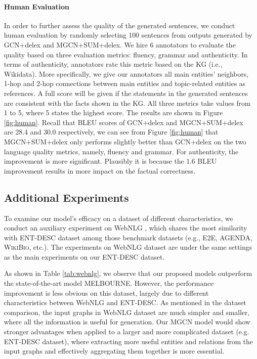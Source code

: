 \documentclass[11pt,a4paper]{article}
\begin{document}
\paragraph{Human Evaluation}
In order to further assess the quality of the generated sentences, we conduct human evaluation by randomly selecting 100 sentences from outputs generated by GCN+delex and MGCN+SUM+delex.
We hire 6 annotators to evaluate the quality based on three evaluation metrics: fluency, grammar and authenticity.
In terms of authenticity, annotators rate this metric based on the KG (i.e., Wikidata).
More specifically, we give our annotators all main entities' neighbors, 1-hop and 2-hop connections between main entities and topic-related entities as references.
A full score will be given if the statements in the generated sentences are consistent with the facts shown in the KG.
All three metrics take values from 1 to 5, where 5 states the highest score.
The results are shown in Figure \ref{fig:human}.
Recall that BLEU scores of GCN+delex and MGCN+SUM+delex are 28.4 and 30.0 respectively, we can see from Figure \ref{fig:human} that MGCN+SUM+delex only performs slightly better than GCN+delex on the two language quality metrics, namely, fluency and grammar. 
For authenticity, the improvement is more significant. Plausibly it is because the 1.6 BLEU improvement results in more impact on the factual correctness. 




\subsection{Additional Experiments}
To examine our model's efficacy on a dataset of different characteristics, we conduct an auxiliary experiment on WebNLG \cite{gardent2017webnlg}, which shares the most similarity with ENT-DESC dataset among those benchmark datasets (e.g., E2E, AGENDA, W\textsc{iki}B\textsc{io}, etc.).
The experiments on WebNLG dataset are under the same settings as the main experiments on our ENT-DESC dataset.

As shown in Table \ref{tab:webnlg}, we observe that our proposed models outperform the state-of-the-art model MELBOURNE.
However, the performance improvement is less obvious on this dataset, largely due to different characteristics between WebNLG and ENT-DESC.
As mentioned in the dataset comparison, the input graphs in WebNLG dataset are much simpler and smaller, where all the information is useful for generation.
Our MGCN model would show stronger advantages when applied to a larger and more complicated dataset (e.g. ENT-DESC dataset),
where extracting more useful entities and relations from the input graphs and effectively aggregating them together is more essential.
\end{document}
